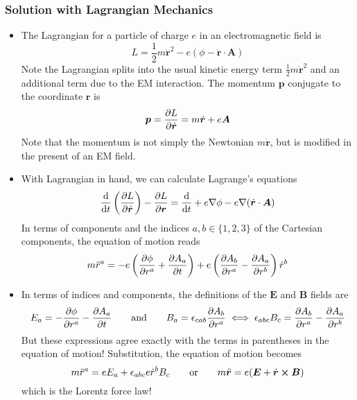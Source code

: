 \documentclass[11pt, a4paper]{article}
\newcommand{\eqtext}[1]{\qquad \text{#1} \qquad}
\newcommand{\bdot}[1]{\dot{\bm{#1}}}
\newcommand{\bddot}[1]{\ddot{\bm{#1}}}
\renewcommand{\grad}{\nabla }
\begin{document}
\subsubsection{Solution with Lagrangian Mechanics}
\begin{itemize}
	\item The Lagrangian for a particle of charge $ e $ in an electromagnetic field is
	\begin{equation*}
		L = \frac{1}{2}m \bdot{r}^{2} - e(\phi - \bdot{r}\cdot \bm{A})
	\end{equation*}
	Note the Lagrangian splits into the usual kinetic energy term $ \frac{1}{2}m \bdot{r}^{2} $ and an additional term due to the EM interaction. The momentum $ \bm{p} $ conjugate to the coordinate $ \bm{r} $ is
	\begin{equation*}
		\bm{p} = \pdv{L}{\bdot{r}} = m \bdot{r} + e\bm{A}
	\end{equation*}
	Note that the momentum is not simply the Newtonian $ m \bdot{r} $, but is modified in the present of an EM field.
	
	\item With Lagrangian in hand, we can calculate Lagrange's equations
	\begin{equation*}
		\dv{}{t}\left(\pdv{L}{\bdot{r}}\right) - \pdv{L}{\bm{r}} = \dv{}{t} (m \bdot{r} + e\bm{A}) + e \grad{\phi} - e  \grad (\bdot{r}\cdot \bm{A})
	\end{equation*}
	In terms of components and the indices $ a, b \in \{1, 2, 3\} $ of the Cartesian components, the equation of motion reads
	\begin{equation*}
		m\ddot{r}^{a} = -e\left(\pdv{\phi}{r^{a}} + \pdv{A_{a}}{t} \right) + e \left(\pdv{A_{b}}{r^{a}} - \pdv{A_{a}}{r^{b}} \right)\dot{r}^{b}
	\end{equation*}
	
	\item In terms of indices and components, the definitions of the $ \bm{E} $ and $ \bm{B} $ fields are
	\begin{equation*}
		E_{a} = -\pdv{\phi}{r^{a}} - \pdv{A_{a}}{t} \eqtext{and}  B_{a} = \epsilon_{cab}\pdv{A_{b}}{r^{a}} \iff \epsilon_{abc}B_{c} = \pdv{A_{b}}{r^{a}} - \pdv{A_{a}}{r^{b}}
	\end{equation*}
	But these expressions agree exactly with the terms in parentheses in the equation of motion! Substitution, the equation of motion becomes
	\begin{equation*}
		m\ddot{r}^{a} = e E_{a} + \epsilon_{abc} e \dot{r}^{b} B_{c} \eqtext{or} m \bddot{r} = e (\bm{E} + \bdot{r} \cross \bm{B})
	\end{equation*}
	which is the Lorentz force law!
\end{itemize}
\end{document}
